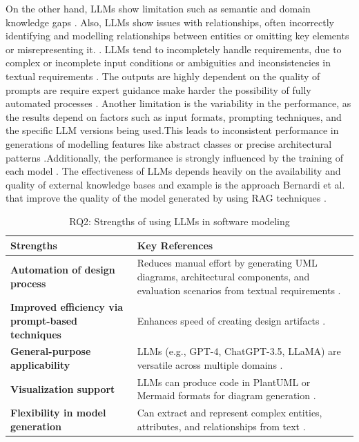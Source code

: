 On the other hand, LLMs show limitation such as semantic and domain knowledge gaps \cite{5ferrari2024,11omar2023,1deBari2024,8z_wang2024}.
Also, LLMs show issues with relationships, often incorrectly identifying and modelling relationships between entities \cite{2babaalla2024,6wang2024} or omitting key elements or misrepresenting it. \cite{4jahan2024,14chaaben2023}.
LLMs tend to incompletely handle requirements, due to complex or incomplete input conditions \cite{5ferrari2024,7eisenreich2024} or ambiguities and inconsistencies in textual requirements \cite{9ruan2023,14chaaben2023}.
The outputs are highly dependent on the quality of prompts are require expert guidance make harder the possibility of fully automated processes \cite{6wang2024,13benardi2024}.
Another limitation is the variability in the performance, as the results depend on factors such as input formats, prompting techniques, and the specific LLM versions being used.This leads to inconsistent performance in generations of modelling features like abstract classes or precise architectural patterns \cite{14chaaben2023,2babaalla2024,3ahmad2023}.Additionally, the performance is strongly influenced by the training of each model \cite{15Naimi}.
The effectiveness of LLMs depends heavily on the availability and quality of external knowledge bases and example is the approach Bernardi et al. that improve the quality of the model generated by using RAG techniques \cite{13benardi2024}.
\begin{table}[htb]
  \centering
  \small
  \renewcommand{\arraystretch}{0.9} %
  \setlength{\tabcolsep}{4pt}
  \begin{tabular}{p{5cm}p{8.5cm}}
  \toprule
  \textbf{Strengths} & \textbf{Key References} \\
  \midrule
  \textbf{Automation of design process} & 
  Reduces manual effort by generating UML diagrams, architectural components, and evaluation scenarios from textual requirements 
  \cite{1deBari2024,4jahan2024,7eisenreich2024,3ahmad2023}. \\[6pt]
  \midrule
  \textbf{Improved efficiency via prompt-based techniques} & 
  Enhances speed of creating design artifacts 
  \cite{12li2024,14chaaben2023}. \\[6pt]
  \midrule
  \textbf{General-purpose applicability} & 
  LLMs (e.g., GPT-4, ChatGPT-3.5, LLaMA) are versatile across multiple domains 
  \cite{7eisenreich2024,8z_wang2024}. \\[6pt]
  \midrule
  \textbf{Visualization support} & 
  LLMs can produce code in PlantUML or Mermaid formats for diagram generation 
  \cite{7eisenreich2024,11omar2023}. \\[6pt]
  \midrule
  \textbf{Flexibility in model generation} & 
  Can extract and represent complex entities, attributes, and relationships from text 
  \cite{2babaalla2024,9ruan2023}. \\
  \bottomrule
  \end{tabular}
  \label{tab:llm_strengths}
  \caption{RQ2: Strengths of using LLMs in software modeling}
\end{table}

